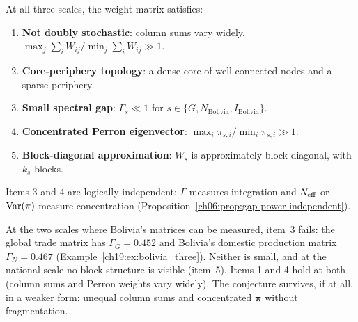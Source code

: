 \documentclass[../structural_economics_book.tex]{subfiles}
\begin{document}
\begin{conjecture}\label{ch19:prop:isomorphism}
At all three scales, the weight matrix satisfies:
\begin{enumerate}
\item \textbf{Not doubly stochastic}: column sums vary widely. $\max_j \sum_i W_{ij} / \min_j \sum_i W_{ij} \gg 1$.
\item \textbf{Core-periphery topology}: a dense core of well-connected nodes and a sparse periphery.
\item \textbf{Small spectral gap}: $\Gamma_s \ll 1$ for $s \in \{G, N_{\text{Bolivia}}, I_{\text{Bolivia}}\}$.
\item \textbf{Concentrated Perron eigenvector}: $\max_i \pi_{s,i} / \min_i \pi_{s,i} \gg 1$.
\item \textbf{Block-diagonal approximation}: $W_s$ is approximately block-diagonal, with $k_s$ blocks.
\end{enumerate}
Items 3 and 4 are logically independent: $\Gamma$ measures integration and $N_{\text{eff}}$ or $\operatorname{Var}(\pi)$ measure concentration (Proposition~\ref{ch06:prop:gap-power-independent}).
\end{conjecture}

At the two scales where Bolivia's matrices can be measured, item~3 fails: the global trade matrix has $\Gamma_G = 0.452$ and Bolivia's domestic production matrix $\Gamma_N = 0.467$ (Example~\ref{ch19:ex:bolivia_three}). Neither is small, and at the national scale no block structure is visible (item~5). Items 1 and 4 hold at both (column sums and Perron weights vary widely). The conjecture survives, if at all, in a weaker form: unequal column sums and concentrated $\boldsymbol{\pi}$ without fragmentation.
\end{document}
